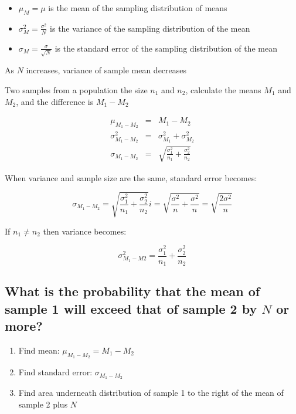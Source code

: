 %
%



\begin{itemize}
  \item $\mu_M = \mu$ is the mean of the sampling distribution of means
  \item $\sigma_M^2 = \frac{\sigma^2}{N}$ is the variance of the sampling
	distribution of the mean
  \item $\sigma_M = \frac{\sigma}{\sqrt{N}}$ is the standard error of the sampling
	distribution of the mean
\end{itemize}

As $N$ increases, variance of sample mean decreases
\hformbar





Two samples from a population the size $n_1$ and $n_2$, calculate the means
$M_1$ and $M_2$, and the difference is $M_1 - M_2$

\begin{eqnarray}
  \mu_{M_1 - M_2} &=& M_1 - M_2 \\
  \sigma_{M_1 - M_2}^2 &=& \sigma_{M_1}^2 + \sigma_{M_2}^2 \\
  \sigma_{M_1 - M_2} &=& \sqrt{\frac{\sigma_1^2}{n_1} + \frac{\sigma_2^2}{n_2}}
\end{eqnarray}

When variance and sample size are the same, standard error becomes:

\begin{equation}
  \sigma_{M_1 - M_2} = \sqrt{\frac{\sigma_1^2}{n_1} + \frac{\sigma_2^2}{n_2}}i
  = \sqrt{ \frac{\sigma^2}{n} + \frac{\sigma^2}{n}}
  = \sqrt{ \frac{2 \sigma^2}{n} }
\end{equation}

If $n_1 \neq n_2$ then variance becomes:

\begin{equation}
  \sigma_{M_1 - M2}^2 = \frac{\sigma_1^2}{n_1} + \frac{\sigma_2^2}{n_2}
\end{equation}

\subsection*{What is the probability that the mean of sample 1 will exceed that of
sample 2 by $N$ or more?}

\begin{enumerate}
  \item Find mean: $\mu_{M_1 - M_2} = M_1 - M_2$
  \item Find standard error: $\sigma_{M_1 - M_2}$
  \item Find area underneath distribution of sample 1 to the right of the mean
	of sample 2 plus $N$
\end{enumerate}

